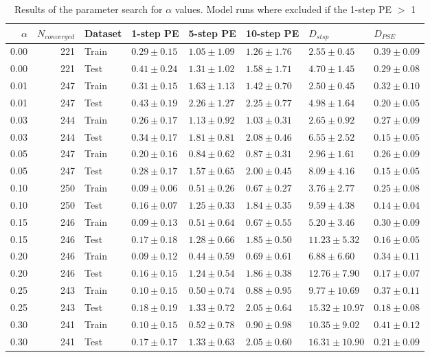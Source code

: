 \begin{table}
\centering
\caption{Results of the parameter search for $\alpha$ values. Model runs where excluded if the 1-step PE $>$ 1}
\label{tab:gridsearch_alpha_table}
\begin{tabular}{rrllllll}
\toprule
$\alpha$ & $N_{converged}$ & Dataset & 1-step PE & 5-step PE & 10-step PE & $D_{stsp}$ & $D_{PSE}$ \\
\midrule
0.00 & 221 & Train & $0.29 \pm 0.15$ & $1.05 \pm 1.09$ & $1.26 \pm 1.76$ & $2.55 \pm 0.45$ & $0.39 \pm 0.09$ \\
0.00 & 221 & Test & $0.41 \pm 0.24$ & $1.31 \pm 1.02$ & $1.58 \pm 1.71$ & $4.70 \pm 1.45$ & $0.29 \pm 0.08$ \\
0.01 & 247 & Train & $0.31 \pm 0.15$ & $1.63 \pm 1.13$ & $1.42 \pm 0.70$ & $2.50 \pm 0.45$ & $0.32 \pm 0.10$ \\
0.01 & 247 & Test & $0.43 \pm 0.19$ & $2.26 \pm 1.27$ & $2.25 \pm 0.77$ & $4.98 \pm 1.64$ & $0.20 \pm 0.05$ \\
0.03 & 244 & Train & $0.26 \pm 0.17$ & $1.13 \pm 0.92$ & $1.03 \pm 0.31$ & $2.65 \pm 0.92$ & $0.27 \pm 0.09$ \\
0.03 & 244 & Test & $0.34 \pm 0.17$ & $1.81 \pm 0.81$ & $2.08 \pm 0.46$ & $6.55 \pm 2.52$ & $0.15 \pm 0.05$ \\
0.05 & 247 & Train & $0.20 \pm 0.16$ & $0.84 \pm 0.62$ & $0.87 \pm 0.31$ & $2.96 \pm 1.61$ & $0.26 \pm 0.09$ \\
0.05 & 247 & Test & $0.28 \pm 0.17$ & $1.57 \pm 0.65$ & $2.00 \pm 0.45$ & $8.09 \pm 4.16$ & $0.15 \pm 0.05$ \\
0.10 & 250 & Train & $0.09 \pm 0.06$ & $0.51 \pm 0.26$ & $0.67 \pm 0.27$ & $3.76 \pm 2.77$ & $0.25 \pm 0.08$ \\
0.10 & 250 & Test & $0.16 \pm 0.07$ & $1.25 \pm 0.33$ & $1.84 \pm 0.35$ & $9.59 \pm 4.38$ & $0.14 \pm 0.04$ \\
0.15 & 246 & Train & $0.09 \pm 0.13$ & $0.51 \pm 0.64$ & $0.67 \pm 0.55$ & $5.20 \pm 3.46$ & $0.30 \pm 0.09$ \\
0.15 & 246 & Test & $0.17 \pm 0.18$ & $1.28 \pm 0.66$ & $1.85 \pm 0.50$ & $11.23 \pm 5.32$ & $0.16 \pm 0.05$ \\
0.20 & 246 & Train & $0.09 \pm 0.12$ & $0.44 \pm 0.59$ & $0.69 \pm 0.61$ & $6.88 \pm 6.60$ & $0.34 \pm 0.11$ \\
0.20 & 246 & Test & $0.16 \pm 0.15$ & $1.24 \pm 0.54$ & $1.86 \pm 0.38$ & $12.76 \pm 7.90$ & $0.17 \pm 0.07$ \\
0.25 & 243 & Train & $0.10 \pm 0.15$ & $0.50 \pm 0.74$ & $0.88 \pm 0.95$ & $9.77 \pm 10.69$ & $0.37 \pm 0.11$ \\
0.25 & 243 & Test & $0.18 \pm 0.19$ & $1.33 \pm 0.72$ & $2.05 \pm 0.64$ & $15.32 \pm 10.97$ & $0.18 \pm 0.08$ \\
0.30 & 241 & Train & $0.10 \pm 0.15$ & $0.52 \pm 0.78$ & $0.90 \pm 0.98$ & $10.35 \pm 9.02$ & $0.41 \pm 0.12$ \\
0.30 & 241 & Test & $0.17 \pm 0.17$ & $1.33 \pm 0.63$ & $2.05 \pm 0.60$ & $16.31 \pm 10.90$ & $0.21 \pm 0.09$ \\
\bottomrule
\end{tabular}
\end{table}
